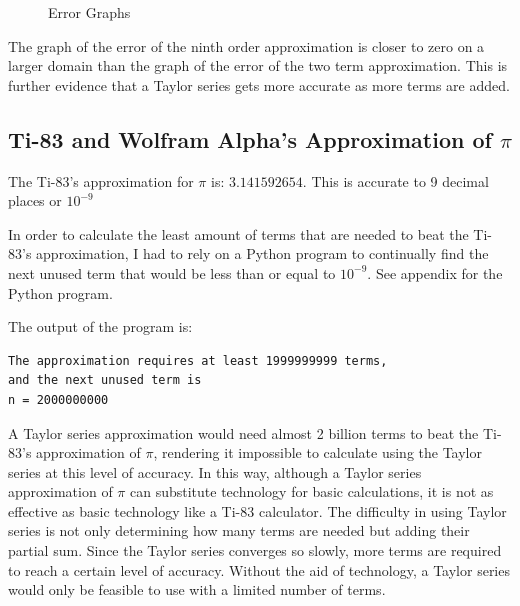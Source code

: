 \documentclass[12pt, titlepage]{article}
\begin{document}
\begin{figure}[H]%
\centering
		\caption{Error Graphs}
	\qquad
\end{figure}


The graph of the error of the ninth order approximation is closer to zero on a larger domain than the graph of the error of the two term approximation. This is further evidence that a Taylor series gets more accurate as more terms are added.

\subsection{Ti-83 and Wolfram Alpha's Approximation of \(\pi\)}
The Ti-83's approximation for \(\pi\) is: \(3.141592654\). This is accurate to 9 decimal places or \(10^{-9}\)

In order to calculate the least amount of terms that are needed to beat the Ti-83's approximation, I had to rely on a Python program to continually find the next unused term that would be less than or equal to \(10^{-9}\). See appendix for the Python program.

The output of the program is:
\begin{verbatim}
The approximation requires at least 1999999999 terms, 
and the next unused term is 
n = 2000000000
\end{verbatim}

A Taylor series approximation would need almost 2 billion terms to beat the Ti-83's approximation of \(\pi\), rendering it impossible to calculate using the Taylor series at this level of accuracy. In this way, although a Taylor series approximation of \(\pi\) can substitute technology for basic calculations, it is not as effective as basic technology like a Ti-83 calculator. The difficulty in using Taylor series is not only determining how many terms are needed but adding their partial sum. Since the Taylor series converges so slowly, more terms are required to reach a certain level of accuracy. Without the aid of technology, a Taylor series would only be feasible to use with a limited number of terms.
\end{document}
